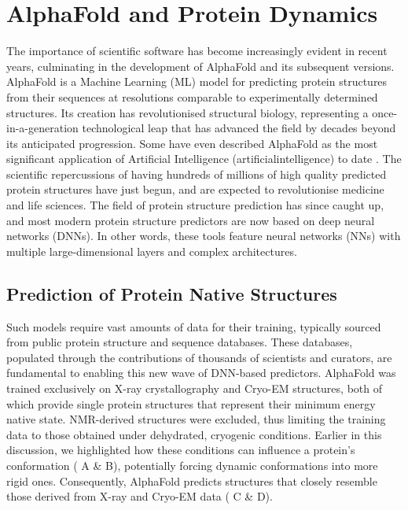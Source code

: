 \section{AlphaFold and Protein Dynamics}

The importance of scientific software has become increasingly evident in recent years, culminating in the development of AlphaFold and its subsequent versions. AlphaFold is a Machine Learning (ML) model for predicting protein structures from their sequences at resolutions comparable to experimentally determined structures. Its creation has revolutionised structural biology, representing a once-in-a-generation technological leap that has advanced the field by decades beyond its anticipated progression. Some have even described AlphaFold as the most significant application of Artificial Intelligence (\gls{artificialintelligence}) to date \cite{toews_alphafold_nodate}. The scientific repercussions of having hundreds of millions of high quality predicted protein structures have just begun, and are expected to revolutionise medicine and life sciences. The field of protein structure prediction has since caught up, and most modern protein structure predictors are now based on deep neural networks (DNNs). In other words, these tools feature neural networks (NNs) with multiple large-dimensional layers and complex architectures.


\subsection{Prediction of Protein Native Structures}

Such models require vast amounts of data for their training, typically sourced from public protein structure and sequence databases. These databases, populated through the contributions of thousands of scientists and curators, are fundamental to enabling this new wave of DNN-based predictors. AlphaFold was trained exclusively on X-ray crystallography and Cryo-EM structures, both of which provide single protein structures that represent their minimum energy native state. NMR-derived structures were excluded, thus limiting the training data to those obtained under dehydrated, cryogenic conditions. Earlier in this discussion, we highlighted how these conditions can influence a protein's conformation ( A \& B), potentially forcing dynamic conformations into more rigid ones. Consequently, AlphaFold predicts structures that closely resemble those derived from X-ray and Cryo-EM data ( C \& D). 

